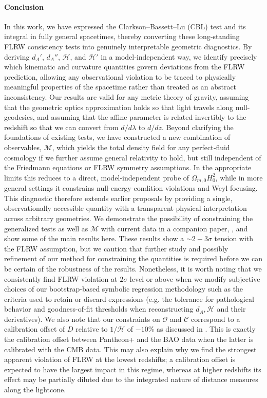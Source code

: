 \documentclass[reprint,aps,prd,nofootinbib,a4paper,10pt,twocolumn,superscriptaddress]{revtex4-2}
\begin{document}
\paragraph*{Conclusion}
In this work, we have expressed the Clarkson–Bassett–Lu (CBL) test and its integral in fully general spacetimes, thereby converting these long‑standing FLRW consistency tests into genuinely interpretable geometric diagnostics. By deriving $d_A'$, $d_A''$, $\mathcal{H}$, and $\mathcal{H}'$ in a model‑independent way, we identify precisely which kinematic and curvature quantities govern deviations from the FLRW prediction, allowing any observational violation to be traced to physically meaningful properties of the spacetime rather than treated as an abstract inconsistency. Our results are valid for any metric theory of gravity, assuming that the geometric optics approximation holds so that light travels along null-geodesics, and assuming that the affine parameter is related invertibly to the redshift so that we can convert from $d/d\lambda$ to $d/dz$.
Beyond clarifying the foundations of existing tests, we have constructed a new combination of observables, $\mathcal{M}$, which yields the total density field for any perfect‑fluid cosmology if we further assume general relativity to hold, but still independent of the Friedmann equations or FLRW symmetry assumptions. In the appropriate limits this reduces to a direct, model‑independent probe of $\Omega_{m,0} H_0^2$, while in more general settings it constrains null‑energy‑condition violations and Weyl focusing. This diagnostic therefore extends earlier proposals by providing a single, observationally accessible quantity with a transparent physical interpretation across arbitrary geometries.
We demonstrate the possibility of constraining the generalized tests as well as $\mathcal{M}$ with current data in a companion paper, \cite{PRD}, and show some of the main results here. These results show a $\sim 2-3\sigma$ tension with the FLRW assumption, but we caution that further study and possibly refinement of our method for constraining the quantities is required before we can be certain of the robustness of the results. Nonetheless, it is worth noting that we consistently find FLRW violation at $2\sigma$ level or above when we modify subjective choices of our bootstrap-based symbolic regression methodology such as the criteria used to retain or discard expressions (e.g. the tolerance for pathological behavior and goodness-of-fit thresholds when reconstructing $d_A, \mathcal{H}$ and their derivatives). We also note that our constraints on $\mathcal{O}$ and $\mathcal{C}$ correspond to a calibration offset of $D$ relative to $1/\mathcal{H}$ of $-10\%$ as discussed in \cite{PRD}. This is exactly the calibration offset between Pantheon+ and the BAO data when the latter is calibrated with the CMB data. This may also explain why we find the strongest apparent violation of FLRW at the lowest redshifts; a calibration offset is expected to have the largest impact in this regime, whereas at higher redshifts its effect may be partially diluted due to the integrated nature of distance measures along the lightcone.
\end{document}
